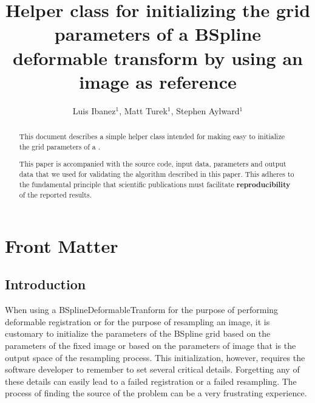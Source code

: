 \documentclass{InsightArticle}
\title{Helper class for initializing the grid parameters of a BSpline
deformable transform by using an image as reference}
\author{Luis Ibanez$^{1}$, Matt Turek$^{1}$, Stephen Aylward$^{1}$}
\begin{document}
%
%

\ifpdf
\else
\fi


\maketitle

\ifhtml
\chapter*{Front Matter\label{front}}
\fi


\begin{abstract}
\noindent
This document describes a simple helper class intended for making easy to
initialize the grid parameters of a .

This paper is accompanied with the source code, input data, parameters and
output data that we used for validating the algorithm described in this paper.
This adheres to the fundamental principle that scientific publications must
facilitate \textbf{reproducibility} of the reported results.
\end{abstract}

\tableofcontents

\section{Introduction}

When using a BSplineDeformableTranform for the purpose of performing deformable
registration or for the purpose of resampling an image, it is customary to
initialize the parameters of the BSpline grid based on the parameters of the
fixed image or based on the parameters of image that is the output space of the
resampling process. This initialization, however, requires the software
developer to remember to set several critical details. Forgetting any of these
details can easily lead to a failed registration or a failed resampling. The
process of finding the source of the problem can be a very frustrating
experience.
\end{document}

